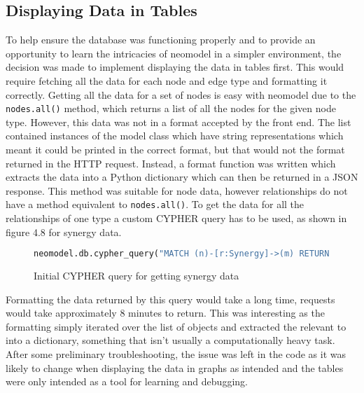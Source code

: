 \subsection{Displaying Data in Tables}
To help ensure the database was functioning properly and to provide an opportunity to learn the intricacies of neomodel in a simpler 
environment, the decision was made to implement displaying the data in tables first. This would require fetching all the data for each 
node and edge type and formatting it correctly. Getting all the data for a set of nodes is easy with neomodel due to the \verb|nodes.all()| method, 
which returns a list of all the nodes for the given node type. However, this data was not in a format accepted by the front end. The list contained 
instances of the model class which have string representations which meant it could be printed in the correct format, but that would not the format 
returned in the HTTP request. Instead, a format function was written which extracts the data into a Python dictionary which can then be returned in a JSON response.
This method was suitable for node data, however relationships do not have a method equivalent to \verb|nodes.all()|. To get the data 
for all the relationships of one type a custom CYPHER query has to be used, as shown in figure 4.8 for synergy data.
\begin{figure}[H]
    \begin{lstlisting}[language=Python]
        neomodel.db.cypher_query("MATCH (n)-[r:Synergy]->(m) RETURN n, r, m")
    \end{lstlisting}
    \caption{Initial CYPHER query for getting synergy data}
\end{figure}
Formatting the data returned by this query would take a long time, requests would take approximately 8 minutes to return.
This was interesting as the formatting simply iterated over the list of objects and extracted the relevant to into a dictionary, something that 
isn't usually a computationally heavy task. After some preliminary troubleshooting, the issue was left in the code as it was likely to change 
when displaying the data in graphs as intended and the tables were only intended as a tool for learning and debugging.

